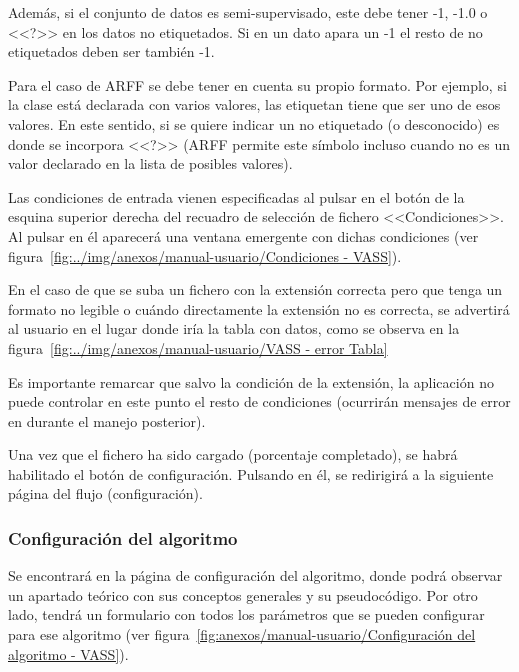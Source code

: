 Además, si el conjunto de datos es semi-supervisado, este debe tener -1, -1.0 o
<<?>> en los datos no etiquetados. Si en un dato apara un -1 el resto de no
etiquetados deben ser también -1.

Para el caso de ARFF se debe tener en cuenta su propio formato. Por ejemplo, si
la clase está declarada con varios valores, las etiquetan tiene que ser uno de
esos valores. En este sentido, si se quiere indicar un no etiquetado (o
desconocido) es donde se incorpora <<?>> (ARFF permite este símbolo incluso
cuando no es un valor declarado en la lista de posibles valores).

Las condiciones de entrada vienen especificadas al pulsar en el botón de la
esquina superior derecha del recuadro de selección de fichero <<Condiciones>>.
Al pulsar en él aparecerá una ventana emergente con dichas condiciones (ver
figura~\ref{fig:../img/anexos/manual-usuario/Condiciones - VASS}).


En el caso de que se suba un fichero con la extensión correcta pero que tenga un formato no legible o cuándo directamente la extensión no es correcta, se advertirá al usuario en el lugar donde iría la tabla con datos, como se observa en la figura~\ref{fig:../img/anexos/manual-usuario/VASS - error Tabla}


Es importante remarcar que salvo la condición de la extensión, la aplicación no puede controlar en este punto el resto de condiciones (ocurrirán mensajes de error en durante el manejo posterior).

Una vez que el fichero ha sido cargado (porcentaje completado), se habrá habilitado el botón de configuración. Pulsando en él, se redirigirá a la siguiente página del flujo (configuración).

\subsubsection{Configuración del algoritmo}
\label{mu:configuracion}
Se encontrará en la página de configuración del algoritmo, donde podrá observar un apartado teórico con sus conceptos generales y su pseudocódigo. Por otro lado, tendrá un formulario con todos los parámetros que se pueden configurar para ese algoritmo (ver figura~\ref{fig:anexos/manual-usuario/Configuración del algoritmo - VASS}).

